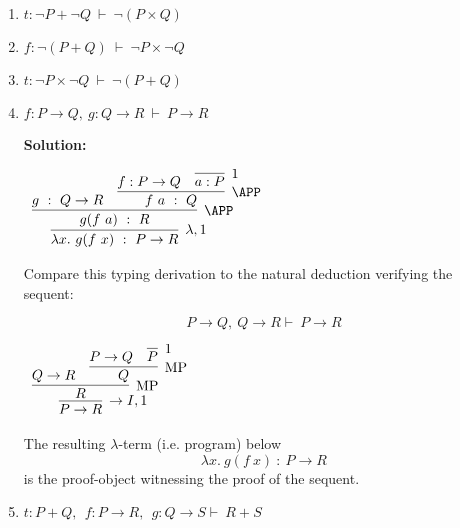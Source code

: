 \documentclass[11pt]{report}
\begin{document}
\begin{enumerate}
\begin{enumerate}
		\item $t : \lnot P + \lnot Q \ \vdash \ \lnot(P\times  Q)$
		\item $f : \lnot(P + Q) \ \vdash \ \lnot P \times \lnot Q$
		\item $t : \lnot P \times \lnot Q \ \vdash \ \lnot(P + Q) $
		\item $f : P\rightarrow  Q, \  g : Q \rightarrow  R \ \vdash \ P \rightarrow R$
		
		{\bf Solution:}
			\begin{mdframed}
				\begin{center}
					$\begin{array}{c}
						\infer[\lambda,1]{\lambda x. \ g (f \ x) \ : \ P \to R}
							{\infer[\APP]{g (f \ a) \ : \ R}
								{g \ : \ Q \to R
								&
								\infer[\APP]{f \ a \ : \ Q}
									{f : P \to Q
									&
									\infer[1]{a : P}{}}}}
					\end{array}$
				\end{center}
			\end{mdframed}

			Compare this typing derivation to the natural deduction verifying the sequent: 

			$$P \rightarrow  Q, \ Q \rightarrow R \vdash \ P \rightarrow  R$$

			\begin{mdframed}
				\begin{center}
					$\begin{array}{c}
						\infer[\to I,1]{P \to R}
							{\infer[\MP]{R}
								{Q \to R
								&
								\infer[\MP]{Q}
									{P \to Q
									&
									\infer[1]{P}{}}}}
					\end{array}$
				\end{center}
			\end{mdframed}

			The resulting $\lambda$-term (i.e. program) below
			$$ \lambda x. \ g (f \ x) \ : \ P \to R$$
			is the proof-object witnessing the proof of the sequent.

		\item $t : P + Q,\ \ f : P \to  R,\ \  g : Q \to S \vdash \ R + S$
		

\end{enumerate}
\end{enumerate}
\end{document}
